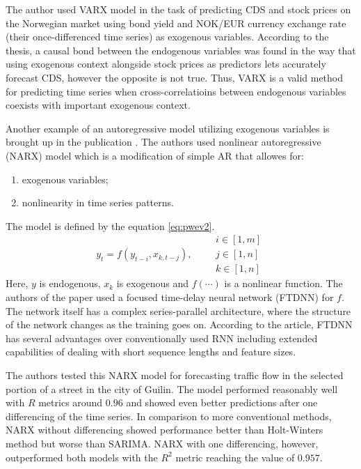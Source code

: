 \documentclass[3p,times,procedia]{elsarticle}
\begin{document}
The author used VARX model in the task of predicting CDS and stock prices on the Norwegian market using bond yield and NOK/EUR currency exchange rate (their once-differenced time series) as exogenous variables. According to the thesis, a causal bond between the endogenous variables was found in the way that using exogenous context alongside stock prices as predictors lets accurately forecast CDS, however the opposite is not true. Thus, VARX is a valid method for predicting time series when cross-correlatioins between endogenous variables coexists with important exogenous context. 

Another example of an autoregressive model utilizing exogenous variables is brought up in the publication \cite{li2022nonlinear}. The authors used nonlinear autoregressive (NARX) model which is a modification of simple AR that allowes for:
\begin{enumerate}
	\item exogenous variables;
	\item nonlinearity in time series patterns.
\end{enumerate}
The model is defined by the equation \ref{eq:pwev2}.
\begin{equation} \label{eq:pwev2}
y_t = f(y_{t-i}, x_{k, t-j}), \qquad \begin{matrix}i \in [1, m] \\ j \in [1, n] \\ k \in [1, n] \end{matrix}
\end{equation}
Here, $y$ is endogenous, $x_k$ is exogenous and $f(\cdots)$ is a nonlinear function. The authors of the paper used a focused time-delay neural network (FTDNN) for $f$. The network itself has a complex series-parallel architecture, where the structure of the network changes as the training goes on. According to the article, FTDNN has several advantages over conventionally used RNN including extended capabilities of dealing with short sequence lengths and feature sizes.

The authors tested this NARX model for forecasting traffic flow in the selected portion of a street in the city of Guilin. The model performed reasonably well with $R$ metrics around $0.96$ and showed even better predictions after one differencing of the time series. In comparison to more conventional methods, NARX without differencing showed performance better than Holt-Winters method but worse than SARIMA. NARX with one differencing, however, outperformed both models with the $R^2$ metric reaching the value of $0.957$.
\end{document}

